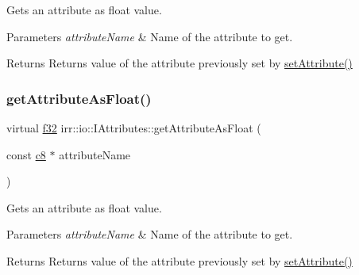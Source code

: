 Gets an attribute as float value. 


\begin{DoxyParams}{Parameters}
{\em attribute\+Name} & Name of the attribute to get. \\
\hline
\end{DoxyParams}
\begin{DoxyReturn}{Returns}
Returns value of the attribute previously set by \hyperlink{classirr_1_1io_1_1IAttributes_a03fa31acb481ae23678676cc183f09a6}{set\+Attribute()} 
\end{DoxyReturn}
\mbox{\label{classirr_1_1io_1_1IAttributes_a9bfcf5b9dae3fa18796c74888bef977f}} 
\subsubsection{\texorpdfstring{get\+Attribute\+As\+Float()}{getAttributeAsFloat()}\hspace{0.1cm}{\footnotesize\ttfamily [2/4]}}
{\footnotesize\ttfamily virtual \hyperlink{namespaceirr_a0277be98d67dc26ff93b1a6a1d086b07}{f32} irr\+::io\+::\+I\+Attributes\+::get\+Attribute\+As\+Float (\begin{DoxyParamCaption}\item[{const \hyperlink{namespaceirr_a9395eaea339bcb546b319e9c96bf7410}{c8} $\ast$}]{attribute\+Name }\end{DoxyParamCaption})\hspace{0.3cm}{\ttfamily [pure virtual]}}



Gets an attribute as float value. 


\begin{DoxyParams}{Parameters}
{\em attribute\+Name} & Name of the attribute to get. \\
\hline
\end{DoxyParams}
\begin{DoxyReturn}{Returns}
Returns value of the attribute previously set by \hyperlink{classirr_1_1io_1_1IAttributes_a03fa31acb481ae23678676cc183f09a6}{set\+Attribute()} 
\end{DoxyReturn}
\mbox{\label{classirr_1_1io_1_1IAttributes_a9ef1a4d52b39daa2f0645df4eb8f40a9}} 
